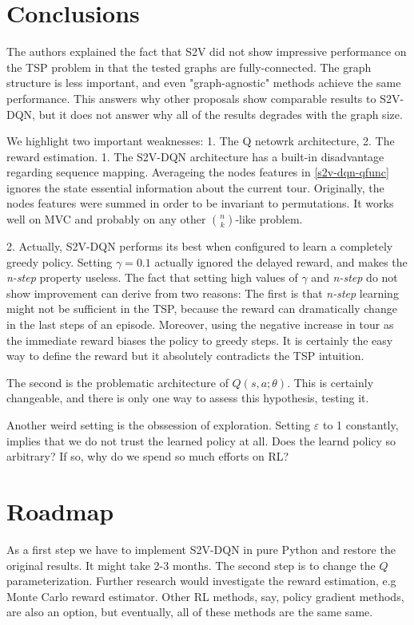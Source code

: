 \documentclass[10pt,a4paper,draft]{article}
\begin{document}
	
\section{Conclusions} \label{sec-conclusions}
The authors explained the fact that S2V did not show impressive performance on the TSP problem in that the tested graphs are fully-connected. The graph structure is less important, and even "graph-agnostic" methods achieve the same performance. This answers why other proposals show comparable results to S2V-DQN, but it does not answer why all of the results degrades with the graph size.

We highlight two important weaknesses: 1. The Q netowrk architecture, 2. The reward estimation.
1. The S2V-DQN architecture has a built-in disadvantage regarding sequence mapping. Averageing the nodes features in \ref{s2v-dqn-qfunc} ignores the state essential information about the current tour. Originally, the nodes features were summed  in order to be invariant to permutations. It works well on MVC and probably on any other ${n \choose k}$-like problem.

2. Actually, S2V-DQN performs its best when configured to learn a completely greedy policy. Setting $\gamma=0.1$ actually ignored the delayed reward, and makes the \textit{n-step} property useless. The fact that setting high values of $\gamma$ and \textit{n-step} do not show improvement can derive from two reasons:
The first is that \textit{n-step} learning might not be sufficient in the TSP, because the reward can dramatically change in the last steps of an episode. Moreover, using the negative increase in tour as the immediate reward biases the policy to greedy steps. It is certainly the easy way to define the reward but it absolutely contradicts the TSP intuition.

The second is the problematic architecture of $Q(s,a;\theta)$. This is certainly changeable, and there is only one way to assess this hypothesis, testing it.

Another weird setting is the obssession of exploration. Setting $\varepsilon$ to 1 constantly, implies that we do not trust the learned policy at all. Does the learnd policy so arbitrary? If so, why do we spend so much efforts on RL?
\section{Roadmap} \label{sec-roadmap}
As a first step we have to implement S2V-DQN in pure Python and restore the original results. It might take 2-3 months. The second step is to change the $Q$ parameterization.
Further research would investigate the reward estimation, e.g Monte Carlo reward estimator. Other RL methods, say, policy gradient methods, are also an option, but eventually, all of these methods are the same same.



\end{document}
